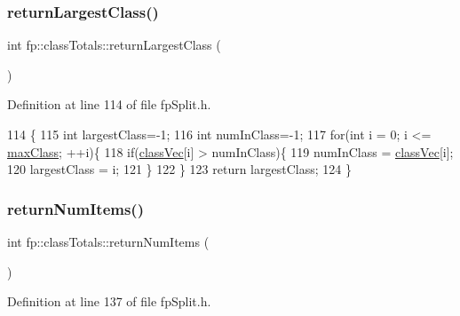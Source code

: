 \subsubsection{\texorpdfstring{return\+Largest\+Class()}{returnLargestClass()}}
{\footnotesize\ttfamily int fp\+::class\+Totals\+::return\+Largest\+Class (\begin{DoxyParamCaption}{ }\end{DoxyParamCaption})\hspace{0.3cm}{\ttfamily [inline]}}



Definition at line 114 of file fp\+Split.\+h.


\begin{DoxyCode}
114                                            \{
115                 \textcolor{keywordtype}{int} largestClass=-1; 
116                 \textcolor{keywordtype}{int} numInClass=-1;
117                 \textcolor{keywordflow}{for}(\textcolor{keywordtype}{int} i = 0; i <= \hyperlink{classfp_1_1classTotals_a83aa8e17bf3b31db3ae19b9ab554624b}{maxClass}; ++i)\{
118                     \textcolor{keywordflow}{if}(\hyperlink{classfp_1_1classTotals_af96102537592dbda8601d0235dfccfca}{classVec}[i] > numInClass)\{
119                         numInClass = \hyperlink{classfp_1_1classTotals_af96102537592dbda8601d0235dfccfca}{classVec}[i];
120                         largestClass = i;
121                     \}
122                 \}
123                 \textcolor{keywordflow}{return} largestClass;
124             \}
\end{DoxyCode}
\mbox{\label{classfp_1_1classTotals_ad4bc21663842003780efaf9fd2b75360}} 
\subsubsection{\texorpdfstring{return\+Num\+Items()}{returnNumItems()}}
{\footnotesize\ttfamily int fp\+::class\+Totals\+::return\+Num\+Items (\begin{DoxyParamCaption}{ }\end{DoxyParamCaption})\hspace{0.3cm}{\ttfamily [inline]}}



Definition at line 137 of file fp\+Split.\+h.



